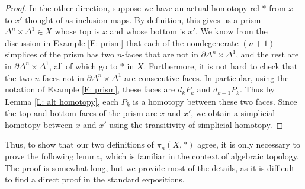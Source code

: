 \documentclass[12pt]{article}
\theoremstyle{plain}
\theoremstyle{definition}
\theoremstyle{remark}
\newcommand{\bd}{\partial}
\begin{document}
\begin{proof}
In the other direction, suppose we have an actual homotopy rel $*$ from $x$ to $x'$ thought of as inclusion maps. By definition, this gives us a prism $\Delta^n\times \Delta^1\in X$ whose top is $x$ and whose bottom is $x'$. We know from the discussion in Example \ref{E: prism} that each of the nondegenerate $(n+1)$-simplices of the prism has two $n$-faces that are not in $\bd \Delta^n\times \Delta^1$, and the rest are in $\bd \Delta^n\times \Delta^1$, all of which go to $*$ in $X$. Furthermore, it is not hard to check that the two  $n$-faces not in $\bd \Delta^n\times \Delta^1$ are consecutive faces. In particular, using the notation of Example \ref{E: prism}, these faces are $d_kP_k$ and $d_{k+1}P_k$. Thus by Lemma \ref{L: alt homotopy}, each $P_k$ is a homotopy between these two faces. Since the top and bottom faces of the prism are $x$ and $x'$, we obtain a simplicial homotopy between $x$ and $x'$ using the transitivity of simplicial homotopy.
\end{proof}

Thus, to show that our two definitions of $\pi_n(X,*)$ agree, it is only necessary to prove the following lemma, which is familiar in the context of algebraic topology. The proof is somewhat long, but we provide most of the details, as it is difficult to find a direct proof in the standard expositions.
\end{document}
